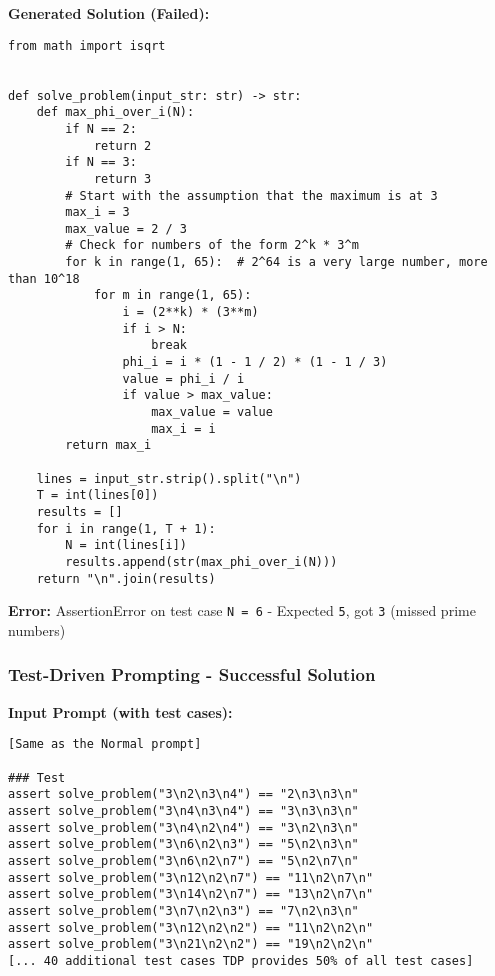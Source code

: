 \documentclass{article}
\begin{document}
\textbf{Generated Solution (Failed):}
\begin{lstlisting}
from math import isqrt


def solve_problem(input_str: str) -> str:
    def max_phi_over_i(N):
        if N == 2:
            return 2
        if N == 3:
            return 3
        # Start with the assumption that the maximum is at 3
        max_i = 3
        max_value = 2 / 3
        # Check for numbers of the form 2^k * 3^m
        for k in range(1, 65):  # 2^64 is a very large number, more than 10^18
            for m in range(1, 65):
                i = (2**k) * (3**m)
                if i > N:
                    break
                phi_i = i * (1 - 1 / 2) * (1 - 1 / 3)
                value = phi_i / i
                if value > max_value:
                    max_value = value
                    max_i = i
        return max_i

    lines = input_str.strip().split("\n")
    T = int(lines[0])
    results = []
    for i in range(1, T + 1):
        N = int(lines[i])
        results.append(str(max_phi_over_i(N)))
    return "\n".join(results)
\end{lstlisting}

\textbf{Error:} AssertionError on test case \texttt{N = 6} - Expected \texttt{5}, got \texttt{3} (missed prime numbers)

\subsubsection{Test-Driven Prompting - Successful Solution}

\textbf{Input Prompt (with test cases):}
\begin{lstlisting}
[Same as the Normal prompt]

### Test
assert solve_problem("3\n2\n3\n4") == "2\n3\n3\n"
assert solve_problem("3\n4\n3\n4") == "3\n3\n3\n"
assert solve_problem("3\n4\n2\n4") == "3\n2\n3\n"
assert solve_problem("3\n6\n2\n3") == "5\n2\n3\n"
assert solve_problem("3\n6\n2\n7") == "5\n2\n7\n"
assert solve_problem("3\n12\n2\n7") == "11\n2\n7\n"
assert solve_problem("3\n14\n2\n7") == "13\n2\n7\n"
assert solve_problem("3\n7\n2\n3") == "7\n2\n3\n"
assert solve_problem("3\n12\n2\n2") == "11\n2\n2\n"
assert solve_problem("3\n21\n2\n2") == "19\n2\n2\n"
[... 40 additional test cases TDP provides 50% of all test cases]
\end{lstlisting}
\end{document}
